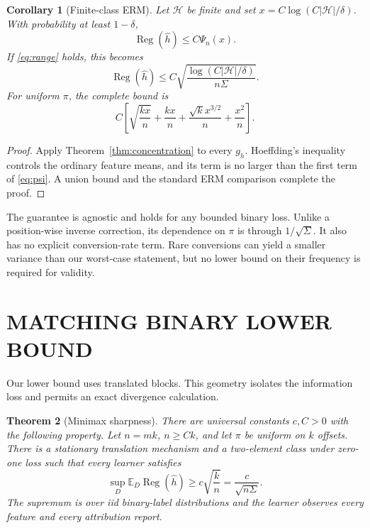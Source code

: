 \documentclass[twoside]{article}
\newtheorem{theorem}{Theorem}
\newtheorem{corollary}[theorem]{Corollary}
\newcommand{\E}{\mathbb E}
\newcommand{\1}{\mathbf 1}
\newcommand{\cH}{\mathcal H}
\newcommand{\Reg}{\operatorname{Reg}}
\begin{document}
\begin{corollary}[Finite-class ERM]\label{cor:erm}
Let $\cH$ be finite and set $x=C\log(C|\cH|/\delta)$. With probability at least $1-\delta$,
\begin{equation}
 \Reg(\widehat h)\le C\Psi_n(x).
 \label{eq:ermfull}
\end{equation}
If \eqref{eq:range} holds, this becomes
\begin{equation}
 \Reg(\widehat h)\le
 C\sqrt{\frac{\log(C|\cH|/\delta)}{n\Sigma}}.
 \label{eq:ermsimple}
\end{equation}
For uniform $\pi$, the complete bound is
\begin{equation}
 C\left[\sqrt{\frac{kx}{n}}+\frac{kx}{n}
 +\frac{\sqrt{k}x^{3/2}}n+\frac{x^2}n\right].
 \label{eq:uniformfull}
\end{equation}
\end{corollary}

\begin{proof}
Apply Theorem~\ref{thm:concentration} to every $g_h$. Hoeffding's inequality controls the ordinary feature means, and its term is no larger than the first term of \eqref{eq:psi}. A union bound and the standard ERM comparison complete the proof.
\end{proof}

The guarantee is agnostic and holds for any bounded binary loss. Unlike a position-wise inverse correction, its dependence on $\pi$ is through $1/\sqrt\Sigma$. It also has no explicit conversion-rate term. Rare conversions can yield a smaller variance than our worst-case statement, but no lower bound on their frequency is required for validity.

\section{MATCHING BINARY LOWER BOUND}

Our lower bound uses translated blocks. This geometry isolates the information loss and permits an exact divergence calculation.

\begin{theorem}[Minimax sharpness]\label{thm:lower}
There are universal constants $c,C>0$ with the following property. Let $n=mk$, $n\ge Ck$, and let $\pi$ be uniform on $k$ offsets. There is a stationary translation mechanism and a two-element class under zero-one loss such that every learner satisfies
\begin{equation}
 \sup_D\E_D\Reg(\widehat h)\ge c\sqrt{\frac{k}{n}}
 =\frac{c}{\sqrt{n\Sigma}}.
 \label{eq:reglower}
\end{equation}
The supremum is over iid binary-label distributions and the learner observes every feature and every attribution report.
\end{theorem}
\end{document}
